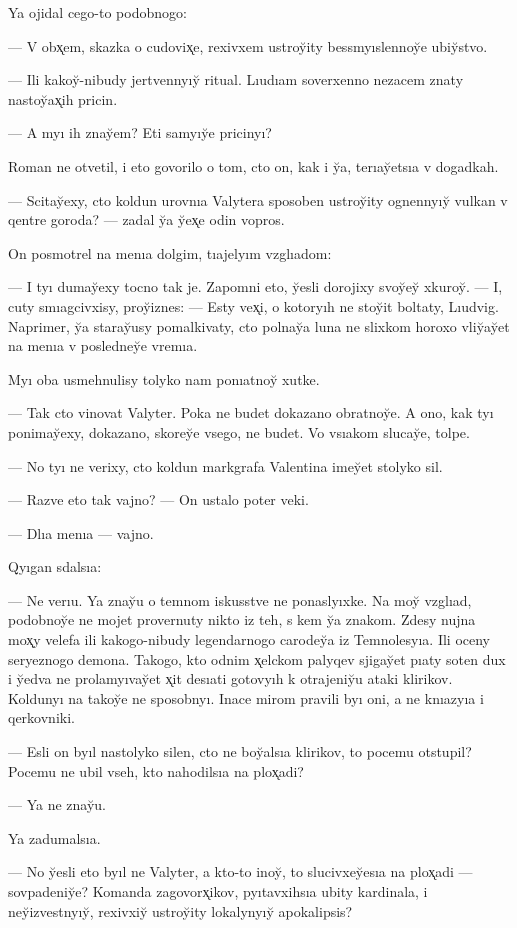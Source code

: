 \documentclass[10pt]{book}
\begin{document}
Ya ojidal cego-to podobnogo:

— V obx̨em, skazka o cudovix̨e, rexivxem ustroy̆ity bessmyıslennoy̆e ubiy̆stvo.

— Ili kakoy̆-nibudy jertvennyıy̆ ritual. Lıudıam soverxenno nezacem znaty nastoy̆ax̨ih pricin.

— A myı ih znay̆em? Eti samyıy̆e pricinyı?

Roman ne otvetil, i eto govorilo o tom, cto on, kak i y̆a, terıay̆etsıa v dogadkah.

— Scitay̆exy, cto koldun urovnıa Valytera sposoben ustroy̆ity ognennyıy̆ vulkan v qentre goroda? — zadal y̆a y̆ex̨e odin vopros.

On posmotrel na menıa dolgim, tıajelyım vzglıadom:

— I tyı dumay̆exy tocno tak je. Zapomni eto, y̆esli dorojixy svoy̆ey̆ xkuroy̆. — I, cuty smıagcivxisy, proy̆iznes: — Esty vex̨i, o kotoryıh ne stoy̆it boltaty, Lıudvig. Naprimer, y̆a staray̆usy pomalkivaty, cto polnay̆a luna ne slixkom horoxo vliy̆ay̆et na menıa v posledney̆e vremıa.

Myı oba usmehnulisy tolyko nam ponıatnoy̆ xutke.

— Tak cto vinovat Valyter. Poka ne budet dokazano obratnoy̆e. A ono, kak tyı ponimay̆exy, dokazano, skorey̆e vsego, ne budet. Vo vsıakom slucay̆e, tolpe.

— No tyı ne verixy, cto koldun markgrafa Valentina imey̆et stolyko sil.

— Razve eto tak vajno? — On ustalo poter veki.

— Dlıa menıa — vajno.

Qyıgan sdalsıa:

— Ne verıu. Ya znay̆u o temnom iskusstve ne ponaslyıxke. Na moy̆ vzglıad, podobnoy̆e ne mojet provernuty nikto iz teh, s kem y̆a znakom. Zdesy nujna mox̨y velefa ili kakogo-nibudy legendarnogo carodey̆a iz Temnolesyıa. Ili oceny seryeznogo demona. Takogo, kto odnim x̨elckom palyqev sjigay̆et pıaty soten dux i y̆edva ne prolamyıvay̆et x̨it desıati gotovyıh k otrajeniy̆u ataki klirikov. Koldunyı na takoy̆e ne sposobnyı. Inace mirom pravili byı oni, a ne knıazyıa i qerkovniki.

— Esli on byıl nastolyko silen, cto ne boy̆alsıa klirikov, to pocemu otstupil? Pocemu ne ubil vseh, kto nahodilsıa na plox̨adi?

— Ya ne znay̆u.

Ya zadumalsıa.

— No y̆esli eto byıl ne Valyter, a kto-to inoy̆, to slucivxey̆esıa na plox̨adi — sovpadeniy̆e? Komanda zagovorx̨ikov, pyıtavxihsıa ubity kardinala, i ney̆izvestnyıy̆, rexivxiy̆ ustroy̆ity lokalynyıy̆ apokalipsis?
\end{document}
